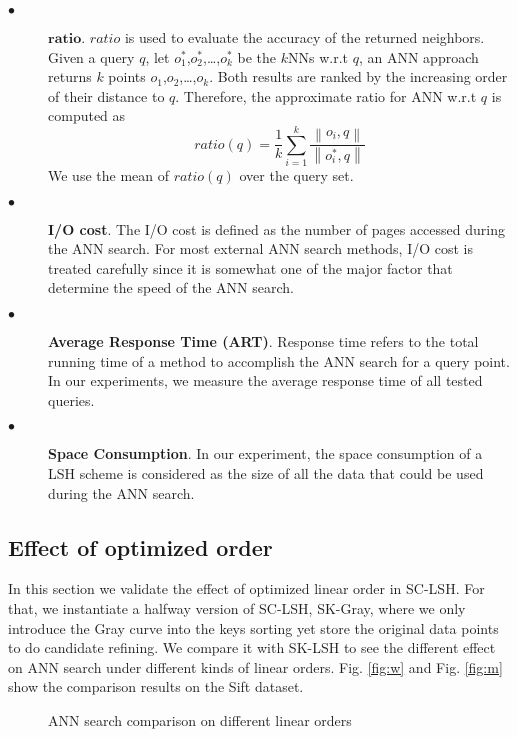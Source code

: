 \documentclass[twocolumn]{svjour3}          %
\begin{document}
\begin{description}
\item[$\bullet$] $\textbf{ratio}$.
$ratio$ is used to evaluate the accuracy of the returned neighbors. Given a query $q$, let $o_1^*$,$o_2^*$,\ldots,$o_k^*$ be the $k$NNs w.r.t $q$, an ANN approach returns $k$ points $o_1$,$o_2$,\ldots,$o_k$. Both results are ranked by the increasing order of their distance to $q$. Therefore, the approximate ratio for ANN w.r.t $q$ is computed as
\begin{equation}
ratio(q) = \frac{1}{k}\sum_{i=1}^{k}\frac{\left\|{ o_i,q }\right\|}{\left\|{ o_i^*,q }\right\|}
\label{Eq:ratio}
\end{equation}
We use the mean of $ratio(q)$ over the query set.
\item [$\bullet$] \textbf{I/O cost}. The I/O cost is defined as the number of pages accessed during the ANN search. For most external ANN search methods, I/O cost is treated carefully since it is somewhat one of the major factor that determine the speed of the ANN search.
\item [$\bullet$] \textbf{Average Response Time (ART)}. Response time refers to the total running time of a method to accomplish the ANN search for a query point. In our experiments, we measure the average response time of all tested queries.
\item [$\bullet$] \textbf{Space Consumption}. In our experiment, the space consumption of a LSH scheme is considered as the size of all the data that could be used during the ANN search.
\end{description}

\subsection{Effect of optimized order}
In this section we validate the effect of optimized linear order in SC-LSH. For that, we instantiate a halfway version of SC-LSH, SK-Gray, where we only introduce the Gray curve into the keys sorting yet store the original data points to do candidate refining. We compare it with SK-LSH to see the different effect on ANN search under different kinds of linear orders. Fig. \ref{fig:w} and Fig. \ref{fig:m} show the comparison results on the Sift dataset.
\begin{figure*}[t]
	\begin{center}
	\end{center}
	\caption{ANN search comparison on different linear orders}
	\label{fig:ordercomp}
\end{figure*}
\end{document}
